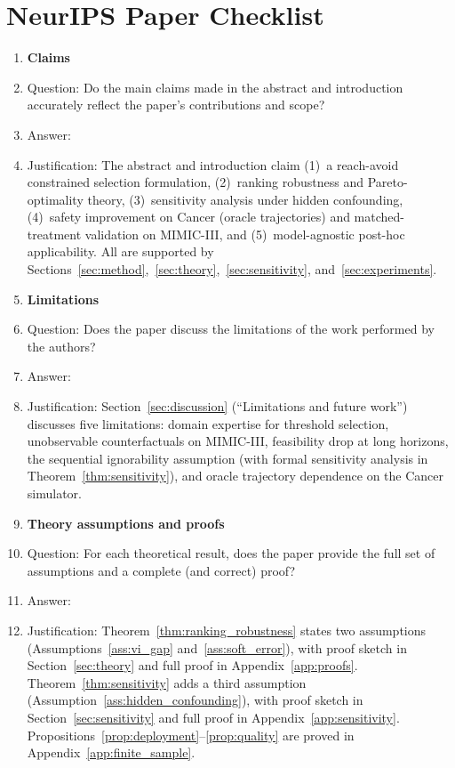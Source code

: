 \documentclass{article}
\begin{document}
\section*{NeurIPS Paper Checklist}

\begin{enumerate}

\item {\bf Claims}
    \item[] Question: Do the main claims made in the abstract and introduction accurately reflect the paper's contributions and scope?
    \item[] Answer: \answerYes{}
    \item[] Justification: The abstract and introduction claim (1)~a reach-avoid constrained selection formulation, (2)~ranking robustness and Pareto-optimality theory, (3)~sensitivity analysis under hidden confounding, (4)~safety improvement on Cancer (oracle trajectories) and matched-treatment validation on MIMIC-III, and (5)~model-agnostic post-hoc applicability. All are supported by Sections~\ref{sec:method},~\ref{sec:theory},~\ref{sec:sensitivity}, and~\ref{sec:experiments}.

\item {\bf Limitations}
    \item[] Question: Does the paper discuss the limitations of the work performed by the authors?
    \item[] Answer: \answerYes{}
    \item[] Justification: Section~\ref{sec:discussion} (``Limitations and future work'') discusses five limitations: domain expertise for threshold selection, unobservable counterfactuals on MIMIC-III, feasibility drop at long horizons, the sequential ignorability assumption (with formal sensitivity analysis in Theorem~\ref{thm:sensitivity}), and oracle trajectory dependence on the Cancer simulator.

\item {\bf Theory assumptions and proofs}
    \item[] Question: For each theoretical result, does the paper provide the full set of assumptions and a complete (and correct) proof?
    \item[] Answer: \answerYes{}
    \item[] Justification: Theorem~\ref{thm:ranking_robustness} states two assumptions (Assumptions~\ref{ass:vi_gap} and~\ref{ass:soft_error}), with proof sketch in Section~\ref{sec:theory} and full proof in Appendix~\ref{app:proofs}. Theorem~\ref{thm:sensitivity} adds a third assumption (Assumption~\ref{ass:hidden_confounding}), with proof sketch in Section~\ref{sec:sensitivity} and full proof in Appendix~\ref{app:sensitivity}. Propositions~\ref{prop:deployment}--\ref{prop:quality} are proved in Appendix~\ref{app:finite_sample}.


\end{enumerate}
\end{document}
